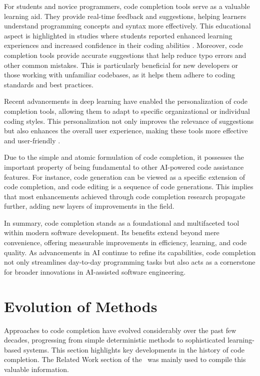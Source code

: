 For students and novice programmers, code completion tools serve as a valuable learning aid. They provide real-time feedback and suggestions, helping learners understand programming concepts and syntax more effectively. This educational aspect is highlighted in studies where students reported enhanced learning experiences and increased confidence in their coding abilities \parencite{takerngsaksiri2023}. Moreover, code completion tools provide accurate suggestions that help reduce typo errors and other common mistakes. This is particularly beneficial for new developers or those working with unfamiliar codebases, as it helps them adhere to coding standards and best practices.

Recent advancements in deep learning have enabled the personalization of code completion tools, allowing them to adapt to specific organizational or individual coding styles. This personalization not only improves the relevance of suggestions but also enhances the overall user experience, making these tools more effective and user-friendly \parencite{giagnorio2025}.

Due to the simple and atomic formulation of code completion, it possesses the important property of being fundamental to other AI-powered code assistance features. For instance, code generation can be viewed as a specific extension of code completion, and code editing is a sequence of code generations. This implies that most enhancements achieved through code completion research propagate further, adding new layers of improvements in the field.

In summary, code completion stands as a foundational and multifaceted tool within modern software development. Its benefits extend beyond mere convenience, offering measurable improvements in efficiency, learning, and code quality. As advancements in AI continue to refine its capabilities, code completion not only streamlines day-to-day programming tasks but also acts as a cornerstone for broader innovations in AI-assisted software engineering.

\section{Evolution of Methods}\label{sec:evolution-of-code-completion}

\begin{sloppypar}
Approaches to code completion have evolved considerably over the past few decades, progressing from simple deterministic methods to sophisticated learning-based systems. This section highlights key developments in the history of code completion. The Related Work section of the~\citet{ciniselli2021} was mainly used to compile this valuable information.
\end{sloppypar}


